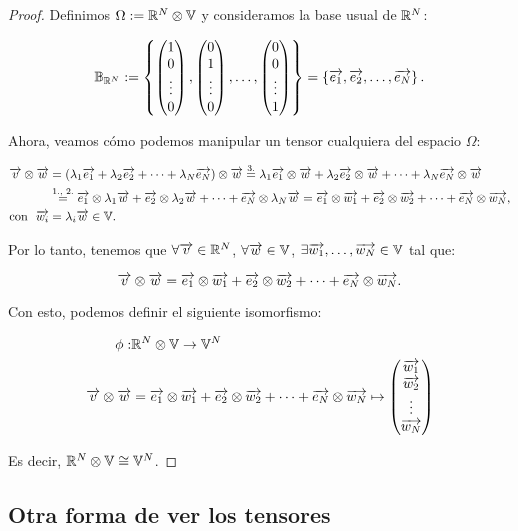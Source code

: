 \begin{proof}
	Definimos $\Omega := \mathbb{R}^N \otimes \mathbb{V}$ y consideramos la base usual de $\mathbb{R}^N$:

	$$\mathbb{B}_{\mathbb{R}^N} := \left\{\begin{pmatrix} 1 \\ 0 \\ \vdots \\ 0 \end{pmatrix}, \begin{pmatrix} 0 \\ 1 \\ \vdots \\ 0 \end{pmatrix}, \ldots, \begin{pmatrix} 0 \\ 0 \\ \vdots \\ 1 \end{pmatrix} \right\} = \left\{\overrightarrow{e_1}, \overrightarrow{e_2}, \ldots, \overrightarrow{e_N} \right\}.$$

	Ahora, veamos cómo podemos manipular un tensor cualquiera del espacio $\Omega$:

	\begin{equation}
		\begin{split}
			\overrightarrow{v} \otimes \overrightarrow{w} &= (\lambda_1 \overrightarrow{e_1} + \lambda_2 \overrightarrow{e_2} + \cdots + \lambda_N \overrightarrow{e_N}) \otimes \overrightarrow{w} \stackrel{\text{3.}}{=} \lambda_1 \overrightarrow{e_1} \otimes \overrightarrow{w} + \lambda_2 \overrightarrow{e_2} \otimes \overrightarrow{w} + \cdots + \lambda_N \overrightarrow{e_N} \otimes \overrightarrow{w} \\
			& \stackrel{\text{1., 2.}}{=} \overrightarrow{e_1} \otimes \lambda_1 \overrightarrow{w} + \overrightarrow{e_2} \otimes \lambda_2 \overrightarrow{w} + \cdots + \overrightarrow{e_N} \otimes \lambda_N \overrightarrow{w} = \overrightarrow{e_1} \otimes \overrightarrow{w_1} + \overrightarrow{e_2} \otimes \overrightarrow{w_2} + \dots + \overrightarrow{e_N} \otimes \overrightarrow{w_N}, \\
			\text{con} \ \  \overrightarrow{w_i} &= \lambda_i \overrightarrow{w} \in \mathbb{V}.
		\end{split}
	\end{equation}

	Por lo tanto, tenemos que $\forall \overrightarrow{v} \in \mathbb{R}^N$, $\forall \overrightarrow{w} \in \mathbb{V}$, $\exists \overrightarrow{w_1}, \ldots, \overrightarrow{w_N} \in \mathbb{V}$ tal que:

	$$\overrightarrow{v} \otimes \overrightarrow{w} = \overrightarrow{e_1} \otimes \overrightarrow{w_1} + \overrightarrow{e_2} \otimes \overrightarrow{w_2} + \cdots + \overrightarrow{e_N} \otimes \overrightarrow{w_N}.$$

	Con esto, podemos definir el siguiente isomorfismo:

	\begin{equation}
		\begin{split}
			\phi: & \mathbb{R}^N \otimes \mathbb{V} \to \mathbb{V}^N \\
			\overrightarrow{v} \otimes \overrightarrow{w} &= \overrightarrow{e_1} \otimes \overrightarrow{w_1} + \overrightarrow{e_2} \otimes \overrightarrow{w_2} + \cdots + \overrightarrow{e_N} \otimes \overrightarrow{w_N} \mapsto \begin{pmatrix} \overrightarrow{w_1} \\ \overrightarrow{w_2} \\ \vdots \\ \overrightarrow{w_N} \end{pmatrix}
		\end{split}
	\end{equation}

	Es decir, $\mathbb{R}^N \otimes \mathbb{V} \cong \mathbb{V}^N$.

\end{proof}

\subsection{Otra forma de ver los tensores} \label{sec:otra_forma_tensores}

